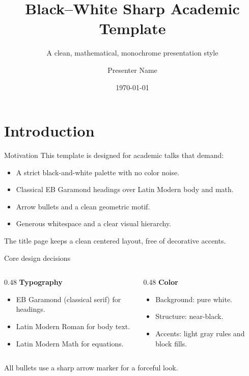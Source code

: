 \documentclass[aspectratio=169,10pt]{beamer}
\title{Black--White Sharp Academic Template}
\subtitle{A clean, mathematical, monochrome presentation style}
\author{Presenter Name}
\institute{Department or Institution}
\date{\today}
\begin{document}
\begin{frame}[plain]
  \titlepage
\end{frame}

\section{Introduction}

\begin{frame}{Motivation}
  This template is designed for academic talks that demand:
  \begin{itemize}
    \item A strict black-and-white palette with no color noise.
    \item Classical EB Garamond headings over Latin Modern body and math.
    \item Arrow bullets and a clean geometric motif.
    \item Generous whitespace and a clear visual hierarchy.
  \end{itemize}
  \vspace{0.5cm}
  The title page keeps a clean centered layout, free of decorative accents.
\end{frame}

\begin{frame}{Core design decisions}
  \begin{columns}[T]
    \begin{column}{0.48\textwidth}
      \textbf{Typography}
      \begin{itemize}
        \item EB Garamond (classical serif) for headings.
        \item Latin Modern Roman for body text.
        \item Latin Modern Math for equations.
      \end{itemize}
    \end{column}
    \begin{column}{0.48\textwidth}
      \textbf{Color}
      \begin{itemize}
        \item Background: pure white.
        \item Structure: near-black.
        \item Accents: light gray rules and block fills.
      \end{itemize}
    \end{column}
  \end{columns}
  \vspace{0.6cm}
  All bullets use a sharp arrow marker for a forceful look.
\end{frame}
\end{document}
